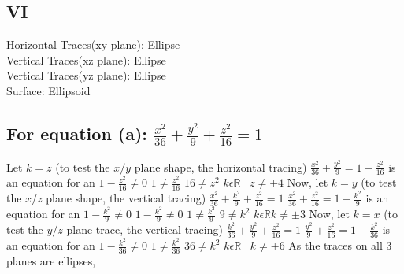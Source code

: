 \documentclass{article}
\begin{document}
\subsection*{VI}
Horizontal Traces(xy plane): Ellipse \\Vertical Traces(xz plane): Ellipse\\Vertical Traces(yz plane): Ellipse \\Surface: Ellipsoid\\[1in]
\begin{multicols*}{2}
    \subsection{For equation (a): $ \frac{x^2}{36}+\frac{y^2}{9}+\frac{z^2}{16}=1$}
Let $k=z$ (to test the $x/y$ plane shape, the horizontal tracing)
\vfill$ \frac{x^2}{36}+\frac{y^2}{9}=1-\frac{z^2}{16}$ is an equation for an 
\vfill$ 1-\frac{z^2}{16}\neq0$
\vfill$ 1 \neq \frac{z^2}{16}$
\vfill$ 16 \neq z^2$
\vfill$ k \epsilon \mathbb{R} \;\;\; z \neq \pm 4$
\vfill Now, let $k=y$ (to test the $x/z$ plane shape, the vertical tracing)
\vfill$ \frac{x^2}{36}+\frac{k^2}{9}+\frac{z^2}{16}=1$
\vfill$ \frac{x^2}{36}+\frac{z^2}{16}=1-\frac{k^2}{9}$ is an equation for an 
\vfill$ 1-\frac{k^2}{9} \neq 0$
\vfill$ 1-\frac{k^2}{9} \neq 0$
\vfill$ 1\neq \frac{k^2}{9}$
\vfill$ 9 \neq k^2$
\vfill$k \epsilon \mathbb{R} k \neq \pm 3$
\vfill Now, let $k=x$ (to test the $y/z$ plane trace, the vertical tracing)
\vfill$ \frac{k^2}{36}+\frac{y^2}{9}+\frac{z^2}{16}=1$
\vfill$ \frac{y^2}{9}+\frac{z^2}{16}=1-\frac{k^2}{36}$ is an equation for an 
\vfill$ 1-\frac{k^2}{36}\neq 0$
\vfill$ 1 \neq \frac{k^2}{36}$
\vfill$ 36 \neq k^2$
\vfill$ k \epsilon \mathbb{R} \;\;\; k \neq \pm 6$
\vfill As the traces on all 3 planes are ellipses, \\[1in]
\vfill\null
\columnbreak

\end{multicols*}
\end{document}

